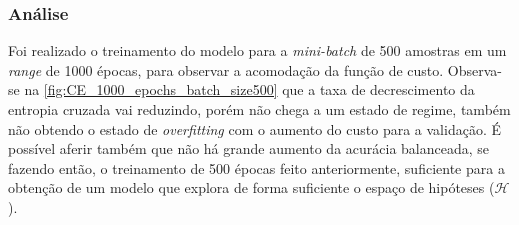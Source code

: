 \subsubsection*{Análise}

Foi realizado o treinamento do modelo para a \textit{mini-batch} de 500 amostras em um \textit{range} de 1000 épocas, para observar a acomodação da função de custo. Observa-se na \autoref{fig:CE_1000_epochs_batch_size500} que a taxa de decrescimento da entropia cruzada vai reduzindo, porém não chega a um estado de regime, também não obtendo o estado de \textit{overfitting} com o aumento do custo para a validação. É possível aferir também que não há grande aumento da acurácia balanceada, se fazendo então, o treinamento de 500 épocas feito anteriormente, suficiente para a obtenção de um modelo que explora de forma suficiente o espaço de hipóteses ($\mathcal{H}$).

